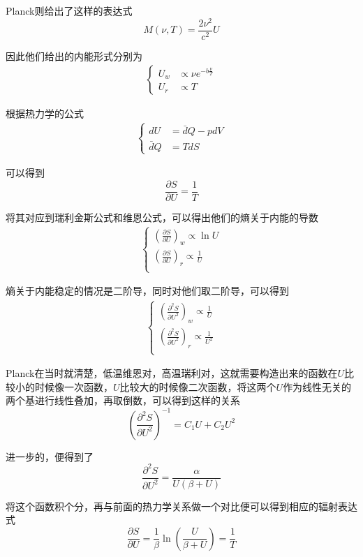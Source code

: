 \documentclass{article}
\begin{document}
Planck则给出了这样的表达式
\[M(\nu,T)=\frac{2\nu^2}{c^2}U\]

因此他们给出的内能形式分别为
\begin{align*}
	\begin{cases}
		U_w & \propto \nu e^{-b\frac{\nu}{T}} \\
		U_r & \propto T
	\end{cases}
\end{align*}

根据热力学的公式
\begin{align*}
	\begin{cases}
		dU       & =\bar{d}Q-pdV \\
		\bar{d}Q & =TdS
	\end{cases}
\end{align*}

可以得到
\[\frac{\partial S}{\partial U}=\frac{1}{T}\]

将其对应到瑞利金斯公式和维恩公式，可以得出他们的熵关于内能的导数
\begin{align*}
	\begin{cases}
		\left(\frac{\partial S}{\partial U}\right)_w  \propto\ln U        \\
		\left(\frac{\partial S}{\partial U}\right)_r  \propto \frac{1}{U} \\
	\end{cases}
\end{align*}

熵关于内能稳定的情况是二阶导，同时对他们取二阶导，可以得到
\begin{align*}
	\begin{cases}
		\left(\frac{\partial^2 S}{{\partial U}^2}\right)_w  \propto\frac{1}{U}    \\
		\left(\frac{\partial^2 S}{{\partial U}^2}\right)_r  \propto \frac{1}{U^2} \\
	\end{cases}
\end{align*}

Planck在当时就清楚，低温维恩对，高温瑞利对，这就需要构造出来的函数在$U$比较小的时候像一次函数，$U$比较大的时候像二次函数，将这两个$U$作为线性无关的两个基进行线性叠加，再取倒数，可以得到这样的关系
\[\left(\frac{\partial^2 S}{{\partial U}^2}\right)^{-1}=C_1U+C_2U^2\]

进一步的，便得到了
\[\frac{\partial^2 S}{{\partial U}^2}=\frac{\alpha}{U(\beta +U)}\]

将这个函数积个分，再与前面的热力学关系做一个对比便可以得到相应的辐射表达式
\[\frac{\partial S}{\partial U}=\frac{1}{\beta}\ln\left(\frac{U}{\beta +U}\right)=\frac{1}{T}\]
\end{document}
